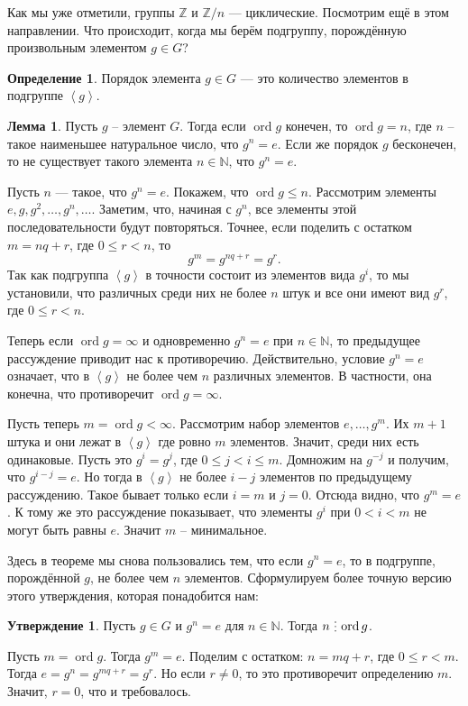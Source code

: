 \documentclass[10pt,a4paper,oneside]{book}
\theoremstyle{definition}
\newtheorem*{defn}{\color{yellow!30!red} Определение}
\newtheorem{lem}{\color{green!50!black}Лемма}
\newtheorem{utvr}{\color{blue!50!black}Утверждение}
\renewcommand{\leq}{\leqslant}
\newcommand{\mb}[1]{\mathbb{#1}}
\newcommand{\ord}{\operatorname{ord}}
\newcommand{\di}{\mathop{\,\scalebox{0.85}{\raisebox{-1.2pt}[0.5\height]{\vdots}}\,}}
\def\lan{\left\langle }
\def\ran{\right\rangle}
\def\dfn{\begin{defn}}
\def\edfn{\end{defn}}
\def\lm{\begin{lem}}
\def\elm{\end{lem}}
\def\utv{\begin{utvr}}
\def\eutv{\end{utvr}}
\begin{document}
Как мы уже отметили, группы $\mb Z$ и $\mb Z/n$ --- циклические. Посмотрим ещё в этом направлении. Что происходит, когда мы берём подгруппу, порождённую произвольным элементом $g \in G$? 


\dfn Порядок элемента $g\in G$ --- это количество элементов в подгруппе $\lan g \ran$.
\edfn

\lm Пусть $g$ -- элемент $G$. Тогда если $\ord g$ конечен, то $\ord g=n$, где $n$ -- такое наименьшее натуральное число, что $g^n=e$. Если же порядок $g$ бесконечен, то не существует такого элемента $n\in \mb N$, что $g^n=e$. 
\elm
\proof Пусть $n$ --- такое, что $g^n=e$. Покажем, что $\ord g \leq n$. Рассмотрим элементы $e,g,g^2,\dots,g^n, \dots$. Заметим, что, начиная с $g^n$, все элементы этой последовательности будут повторяться. Точнее, если поделить с остатком $m=nq+r$, где $0\leq r<n$, то
$$g^m=g^{nq+r}=g^r.$$
Так как подгруппа $\lan g \ran$ в точности состоит из элементов вида $g^i$, то мы установили, что различных среди них не более $n$ штук и все они имеют вид $g^r$, где $0\leq r < n$. 

Теперь если  $\ord g= \infty$ и одновременно $g^n=e$ при $n \in \mb N$, то предыдущее рассуждение приводит нас к противоречию. Действительно, условие $g^n=e$ означает, что в $\lan g\ran$ не более чем $n$ различных элементов. В частности, она конечна, что противоречит  $\ord g= \infty$.

Пусть теперь  $m=\ord g < \infty$. Рассмотрим набор элементов $e,\dots,g^m$. Их $m+1$ штука и они лежат в $\lan g \ran$ где ровно $m$ элементов. Значит, среди них есть одинаковые. Пусть это $g^i=g^j$, где $0\leq j <i\leq m$. Домножим на $g^{-j}$ и получим, что $g^{i-j}=e$. Но тогда в $\lan g \ran $ не более $i-j$ элементов по предыдущему рассуждению. Такое бывает только если $i=m$ и $j=0$.  Отсюда видно, что $g^m=e$. К тому же это рассуждение показывает, что элементы $g^i$ при $0<i<m$ не могут быть равны $e$. Значит $m$ -- минимальное. 
\endproof

Здесь в теореме мы снова пользовались тем, что если $g^n=e$, то в подгруппе, порождённой $g$, не более чем $n$ элементов. Сформулируем более точную версию этого утверждения, которая понадобится нам:

\utv Пусть $g\in  G$ и $g^n=e$ для $n\in \mb N$. Тогда $n \di \ord g$.
\eutv
\proof Пусть $m=\ord g$. Тогда $g^m=e$. Поделим с остатком: $n=mq+r$, где $0\leq r < m$. Тогда $e=g^n=g^{mq+r}=g^r$. Но если $r\neq 0$, то это противоречит определению $m$. Значит, $r=0$, что и требовалось.
\endproof
\end{document}
